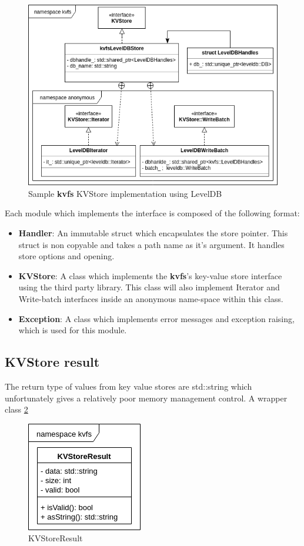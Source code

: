\documentclass[bsc,frontabs,twoside,singlespacing,parskip,deptreport]{infthesis}     %
\begin{document}
{\begin{figure}[h!]
	\centering
	\includegraphics[scale=0.6]{diagrams/kvfs_kvstore_impl.png}
	\caption{Sample {\bf kvfs} KVStore implementation using LevelDB}
	 \label{fig:kvfs_kvstore_impl}
\end{figure}

Each module which implements the interface is composed of the following format:
\begin{itemize}
\item \textbf{Handler}: An immutable struct which encapsulates the store pointer. This struct is non copyable and takes a path name as it's argument. It handles store options and opening.
\item \textbf{KVStore}: A class which implements the {\bf kvfs}'s key-value store interface using the third party library. This class will also implement Iterator and Write-batch interfaces inside an anonymous name-space within this class.
\item \textbf{Exception}: A class which implements error messages and exception raising, which is used for this module.
\end{itemize}
\subsection{KVStore result}
The return type of values from key value stores are std::string which unfortunately gives a relatively poor memory management control.
A wrapper class \ref{fig:kvfs_kvstore_result}
\begin{figure}
	\centering
	\includegraphics[scale=0.6]{diagrams/kvfs_KVStoreResult.png}
	\caption{KVStoreResult}
	 \label{fig:kvfs_kvstore_result}
\end{figure}

}
\end{document}
